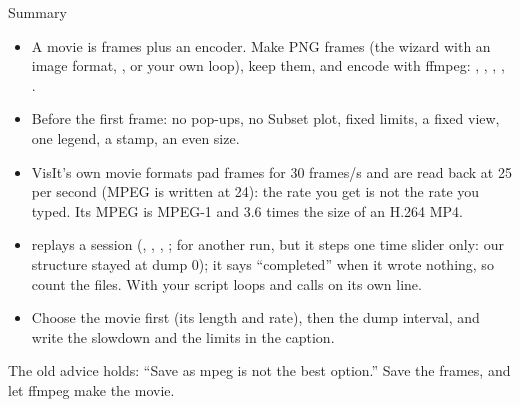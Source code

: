 \documentclass[aspectratio=169,11pt]{beamer}
\begin{document}
\begin{frame}{Summary}
\label{fr:summary}
\footnotesize
\begin{itemize}\setlength{\itemsep}{1pt}
  \item A movie is frames plus an encoder. Make PNG frames (the wizard with an image format, , or your own loop), keep them, and encode with ffmpeg: , , , , .
  \item Before the first frame: no pop-ups, no Subset plot, fixed limits, a fixed view, one legend, a  stamp, an even size.
  \item VisIt's own movie formats pad frames for 30 frames/s and are read back at 25 per second (MPEG is written at 24): the rate you get is not the rate you typed. Its MPEG is MPEG-1 and 3.6 times the size of an H.264 MP4.
  \item {} replays a session (, , , ;  for another run, but it steps one time slider only: our structure stayed at dump 0); it says ``completed'' when it wrote nothing, so count the files. With  your script loops and calls  on its own line.
  \item Choose the movie first (its length and rate), then the dump interval, and write the slowdown and the limits in the caption.
\end{itemize}
\begin{punchbox}
\small The old advice holds: ``Save as mpeg is not the best option.'' Save the frames, and let ffmpeg make the movie.
\end{punchbox}
\end{frame}
\end{document}
